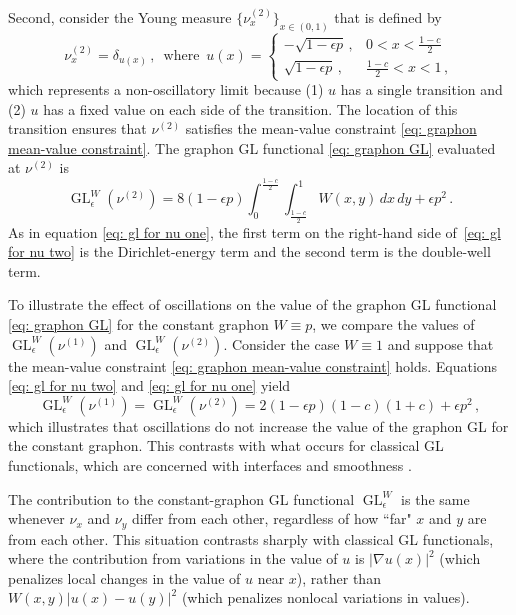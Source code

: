 \documentclass[11pt]{amsart}
\def\ep{\epsilon}
\def\GL{\operatorname{GL}}
\numberwithin{equation}{section}
\begin{document}
{Second, consider the Young measure $\{\nu^{(2)}_x\}_{x\in (0,1)}$ that is defined by 
\begin{equation}
	\nu^{(2)}_x = \delta_{u(x)}\,, \, \text{ where } \, u(x) 
		= \begin{cases}
		        -\sqrt{1 - \ep p}\, , &0 < x < \frac{1 - c}{2} \\
        			\sqrt{1 - \ep p}\, , &\frac{1 - c}{2} < x < 1\,,
    \end{cases}
\end{equation}
which represents a non-oscillatory limit because (1) $u$ has a single transition and (2) $u$ has a fixed value on each side of the transition. The location of this transition ensures that $\nu^{(2)}$ satisfies the mean-value} constraint \eqref{eq: graphon mean-value constraint}. The graphon GL functional \eqref{eq: graphon GL} evaluated at $\nu^{(2)}$ is 
    \begin{equation}\label{eq: gl for nu two}
        {\GL^W_\ep(\nu^{(2)}) = 8 (1 - \ep p) \int_0^{\frac{1 - c}{2}} \int_{\frac{1 - c}{2}}^1 W(x,y) \,dx \,dy + \ep p^2} \,. 
    \end{equation}
As in equation \eqref{eq: gl for nu one}, the first term on the right-hand side of~\eqref{eq: gl for nu two} is the Dirichlet-energy term and the second term is the double-well term. 

To illustrate the effect of oscillations on the value of the graphon GL functional {\eqref{eq: graphon GL} for the constant graphon $W \equiv p$}, we compare the values of $\GL^W_\ep(\nu^{(1)})$ and $\GL^W_\ep(\nu^{(2)})$. Consider the case $W \equiv 1$ and suppose that the {mean-value constraint} \eqref{eq: graphon mean-value constraint} holds. Equations \eqref{eq: gl for nu two} and \eqref{eq: gl for nu one} yield
\begin{equation*}
    \GL^W_\ep(\nu^{(1)}) = \GL^W_\ep(\nu^{(2)}) = 2{(1 - \ep p)} (1 - c)(1 + c) + \ep p^2 \,,
\end{equation*}
which illustrates that oscillations do not increase the value of the graphon GL for the constant graphon.
This contrasts with what occurs for classical GL functionals, which are concerned with interfaces and smoothness \cite{du2020phase}. 


The contribution to the constant-graphon GL functional $\GL^W_\ep$ is the same whenever $\nu_x$ and $\nu_y$ differ from each other, regardless of how ``far" $x$ and $y$ are from each other. This situation contrasts sharply with classical GL functionals, where the contribution from variations in the value of $u$ is $|\nabla u(x)|^2$ (which penalizes local changes in the value of $u$ near $x$), rather than $W(x,y)|u(x) - u(y)|^2$ (which {penalizes nonlocal} variations in values).
\end{document}
